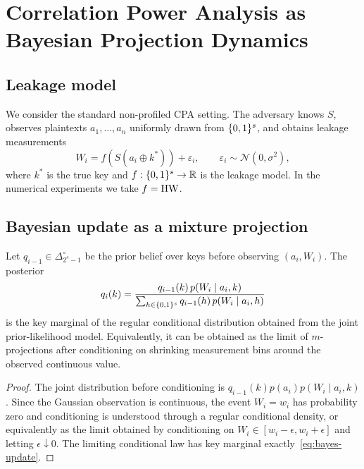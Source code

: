 \section{Correlation Power Analysis as Bayesian Projection Dynamics}\label{sec:cpa}

\subsection{Leakage model}\label{subsec:adv-model}

We consider the standard non-profiled CPA setting.  The adversary knows $S$,
observes plaintexts $a_1,\ldots,a_n$ uniformly drawn from $\{0,1\}^{s}$, and obtains
leakage measurements
\begin{equation}\label{eq:leakage-model}
  W_i = f(S(a_i\oplus k^*)) + \varepsilon_i,
  \qquad \varepsilon_i \sim \mathcal N(0,\sigma^2),
\end{equation}
where $k^*$ is the true key and $f:\{0,1\}^{s}\to\mathbb{R}$ is the leakage model.  In the
numerical experiments we take $f = \mathrm{HW}$.

\subsection{Bayesian update as a mixture projection}\label{subsec:bayes-m}

\begin{theorem}\label{thm:cpa-m-proj}
  Let $q_{i-1}\in\Delta_{2^s-1}^{\circ}$ be the prior belief over keys before
  observing $(a_i,W_i)$.  The posterior
  \begin{equation}\label{eq:bayes-update}
    q_i(k) = \frac{q_{i-1}(k)\,p(W_i\mid a_i,k)}
                 {\sum_{h\in\{0,1\}^{s}} q_{i-1}(h)\,p(W_i\mid a_i,h)}
  \end{equation}
  is the key marginal of the regular conditional distribution obtained from
  the joint prior-likelihood model.  Equivalently, it can be obtained as the
  limit of $m$-projections after conditioning on shrinking measurement bins
  around the observed continuous value.
\end{theorem}

\begin{proof}
  The joint distribution before conditioning is $q_{i-1}(k)p(a_i)p(W_i\mid a_i,k)$.
  Since the Gaussian observation is continuous, the event $W_i=w_i$ has
  probability zero and conditioning is understood through a regular conditional
  density, or equivalently as the limit obtained by conditioning on
  $W_i\in[w_i-\epsilon,w_i+\epsilon]$ and letting $\epsilon\downarrow0$.
  The limiting conditional law has key marginal exactly~\eqref{eq:bayes-update}.
\end{proof}

